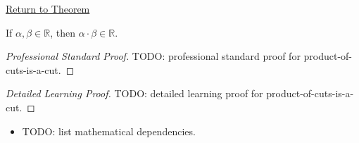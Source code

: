 \newpage
{}
\label{prf:product-of-cuts-is-a-cut}

\begin{remark*}[Return]
\hyperref[lem:product-of-cuts-is-a-cut]{Return to Theorem}
\end{remark*}

\begin{lemma*}
If $\alpha,\beta\in\mathbb{R}$, then $\alpha\cdot\beta\in\mathbb{R}$.
\end{lemma*}

\begin{proof}[Professional Standard Proof]
\LRAProofBodyStart
TODO: professional standard proof for product-of-cuts-is-a-cut.
\end{proof}

\begin{proof}[Detailed Learning Proof]
\LRAProofBodyStart
TODO: detailed learning proof for product-of-cuts-is-a-cut.
\end{proof}

\begin{remark*}
\end{remark*}

\begin{dependencies}
\begin{itemize}
  \item TODO: list mathematical dependencies.
\end{itemize}
\end{dependencies}

\clearpage
